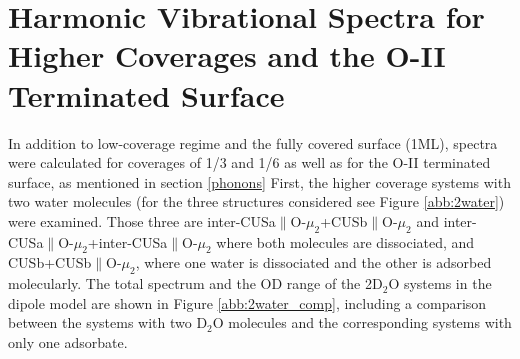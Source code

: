 \documentclass[11pt,DIV=13,BCOR=5mm,a4paper,headinclude]{scrbook}
\begin{document}
\section{Harmonic Vibrational Spectra for Higher Coverages and the O-II Terminated Surface}\label{app:11-20_freq_hig_cov+O-II}
In addition to low-coverage regime and the fully covered surface (1ML), spectra were calculated for coverages of 1/3 and 1/6 as well as for the O-II terminated surface, as mentioned in section \ref{phonons}
First, the higher coverage systems with two water molecules (for the three structures considered see Figure \ref{abb:2water}) were examined. %
Those three are inter-CUSa$\parallel$O-$\mu_2$+CUSb$\parallel$O-$\mu_2$ and inter-CUSa$\parallel$O-$\mu_2$+inter-CUSa$\parallel$O-$\mu_2$ where both molecules are dissociated, and CUSb+CUSb$\parallel$O-$\mu_2$, where one water is dissociated and the other is adsorbed molecularly.
The total spectrum and the OD range of the 2D$_2$O systems in the dipole model are shown in Figure %
\ref{abb:2water_comp}, including a comparison between the systems with two D$_2$O molecules and the corresponding systems with only one adsorbate.
\end{document}
